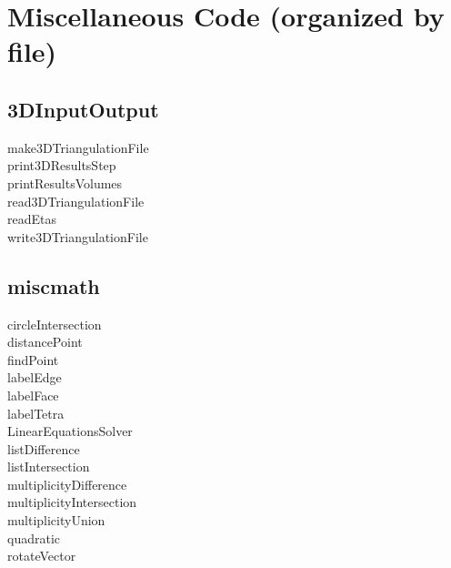                       

\chapter{Miscellaneous Code (organized by file)}

\section{3DInputOutput}

\begin{description}
\item[make3DTriangulationFile] 

\item[print3DResultsStep] 

\item[printResultsVolumes] 

\item[read3DTriangulationFile] 

\item[readEtas] 

\item[write3DTriangulationFile] 
\end{description}

\bigskip

\section{miscmath}

\begin{description}
\item[circleIntersection] 

\item[distancePoint] 

\item[findPoint] 

\item[labelEdge] 

\item[labelFace] 

\item[labelTetra] 

\item[LinearEquationsSolver] 

\item[listDifference] 

\item[listIntersection] 

\item[multiplicityDifference] 

\item[multiplicityIntersection] 

\item[multiplicityUnion] 

\item[quadratic] 

\item[rotateVector] 
\end{description}

